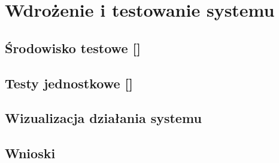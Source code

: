 \newpage\section{Wdrożenie i testowanie systemu \NazwaSys} \label{sec:testy}
\subsection[Środowisko testowe]{Środowisko testowe [\StudentA]}

\newpage
\subsection[Testy jednostkowe]{Testy jednostkowe [\StudentB]}

\newpage
\subsection[Wizualizacja działania systemu]{Wizualizacja działania systemu \textsl{\NazwaSys}}

\newpage
\subsection{Wnioski}
 
